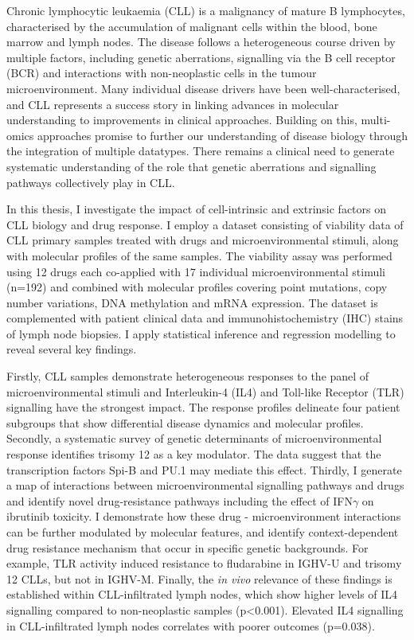 \documentclass[11pt, a4paper, twosided]{book}
\begin{document}
    Chronic lymphocytic leukaemia (CLL) is a malignancy of mature B lymphocytes, characterised by the accumulation of malignant cells within the blood, bone marrow and lymph nodes. The disease follows a heterogeneous course driven by multiple factors, including genetic aberrations, signalling via the B cell receptor (BCR) and interactions with non-neoplastic cells in the tumour microenvironment. Many individual disease drivers have been well-characterised, and CLL represents a success story in linking advances in molecular understanding to improvements in clinical approaches. Building on this, multi-omics approaches promise to further our understanding of disease biology through the integration of multiple datatypes. There remains a clinical need to generate systematic understanding of the role that genetic aberrations and signalling pathways collectively play in CLL.

    In this thesis, I investigate the impact of cell-intrinsic and extrinsic factors on CLL biology and drug response. I employ a dataset consisting of viability data of CLL primary samples treated with drugs and microenvironmental stimuli, along with molecular profiles of the same samples. The viability assay was performed using 12 drugs each co-applied with 17 individual microenvironmental stimuli (n=192) and combined with molecular profiles covering point mutations, copy number variations, DNA methylation and mRNA expression. The dataset is complemented with patient clinical data and immunohistochemistry (IHC) stains of lymph node biopsies. I apply statistical inference and regression modelling to reveal several key findings.

    Firstly, CLL samples demonstrate heterogeneous responses to the panel of microenvironmental stimuli and Interleukin-4 (IL4) and Toll-like Receptor (TLR) signalling have the strongest impact. The response profiles delineate four patient subgroups that show differential disease dynamics and molecular profiles. Secondly, a systematic survey of genetic determinants of microenvironmental response identifies trisomy 12 as a key modulator. The data suggest that the transcription factors Spi-B and PU.1 may mediate this effect. Thirdly, I generate a map of interactions between microenvironmental signalling pathways and drugs and identify novel drug-resistance pathways including the effect of IFN\(\gamma\) on ibrutinib toxicity. I demonstrate how these drug - microenvironment interactions can be further modulated by molecular features, and identify context-dependent drug resistance mechanism that occur in specific genetic backgrounds. For example, TLR activity induced resistance to fludarabine in IGHV-U and trisomy 12 CLLs, but not in IGHV-M. Finally, the \emph{in vivo} relevance of these findings is established within CLL-infiltrated lymph nodes, which show higher levels of IL4 signalling compared to non-neoplastic samples (p\textless0.001). Elevated IL4 signalling in CLL-infiltrated lymph nodes correlates with poorer outcomes (p=0.038).
\end{document}
